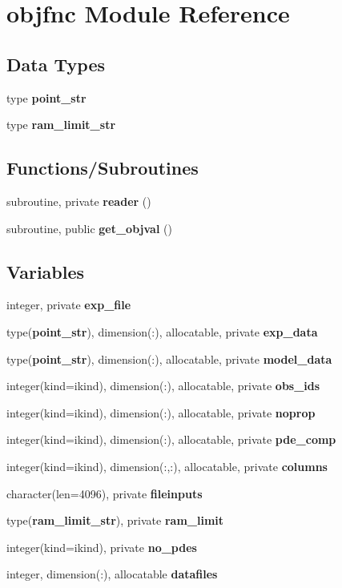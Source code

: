 \section{objfnc Module Reference}
\label{namespaceobjfnc}
\subsection*{Data Types}
\begin{DoxyCompactItemize}
\item 
type {\bf point\+\_\+str}
\item 
type {\bf ram\+\_\+limit\+\_\+str}
\end{DoxyCompactItemize}
\subsection*{Functions/\+Subroutines}
\begin{DoxyCompactItemize}
\item 
subroutine, private {\bf reader} ()
\item 
subroutine, public {\bf get\+\_\+objval} ()
\end{DoxyCompactItemize}
\subsection*{Variables}
\begin{DoxyCompactItemize}
\item 
integer, private {\bf exp\+\_\+file}
\item 
type({\bf point\+\_\+str}), dimension(\+:), allocatable, private {\bf exp\+\_\+data}
\item 
type({\bf point\+\_\+str}), dimension(\+:), allocatable, private {\bf model\+\_\+data}
\item 
integer(kind=ikind), dimension(\+:), allocatable, private {\bf obs\+\_\+ids}
\item 
integer(kind=ikind), dimension(\+:), allocatable, private {\bf noprop}
\item 
integer(kind=ikind), dimension(\+:), allocatable, private {\bf pde\+\_\+comp}
\item 
integer(kind=ikind), dimension(\+:,\+:), allocatable, private {\bf columns}
\item 
character(len=4096), private {\bf fileinputs}
\item 
type({\bf ram\+\_\+limit\+\_\+str}), private {\bf ram\+\_\+limit}
\item 
integer(kind=ikind), private {\bf no\+\_\+pdes}
\item 
integer, dimension(\+:), allocatable {\bf datafiles}
\end{DoxyCompactItemize}


